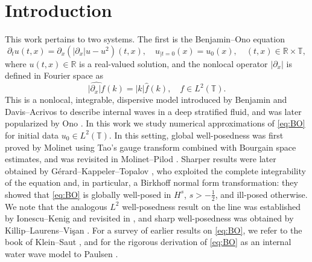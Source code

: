 \documentclass [11pt] {article}
\newcommand{\<}{\langle}
\renewcommand{\>}{\rangle}
\begin{document}

\section{Introduction}

 This work pertains to two systems.  The first
is the Benjamin--Ono equation
%
\begin{equation}\label{eq:BO}\tag{BO}
\partial_t u(t,x) = \partial_x \left( |\partial_x| u - u^2 \right)(t,x), \quad  u_{|t=0}(x) = u_0(x), \quad (t,x) \in \mathbb{R} \times \mathbb{T}, 
\end{equation}
\renewcommand*{\theHequation}{notag.\theequation}%
%
where $u(t,x)\in \mathbb{R}$ is a real-valued solution, and the nonlocal operator $|\partial_x|$ is defined in Fourier space as
\[
\widehat{|\partial_x|f}(k) = |k|\widehat{f}(k), \quad f\in L^2(\mathbb T).
\]
This is a nonlocal, integrable, dispersive model introduced by Benjamin \cite{BO} and Davis--Acrivos \cite{davis1967solitary} to describe internal waves in a deep stratified fluid, and was later popularized by Ono \cite{ono1975algebraic}.
%
In this work we study numerical approximations of \eqref{eq:BO} for initial data $u_0 \in L^2(\mathbb{T})$. In this setting, {global well-posedness was first proved by Molinet \cite{Molinet08}} using Tao’s gauge transform combined with Bourgain space estimates, and was revisited in Molinet--Pilod \cite{Molinet12}. Sharper results were later obtained by Gérard–Kappeler–Topalov \cite{Gerard23WP}, who exploited the complete integrability of the equation and, in particular, a Birkhoff normal form transformation: they showed that \eqref{eq:BO} is globally well-posed in $H^s$, $s>-\frac12$, and ill-posed otherwise. We note that the analogous $L^2$ well-posedness result on the line was established by Ionescu--Kenig \cite{IK} and revisited in \cites{Molinet12,IT,Talbut}, and sharp well-posedness was obtained by Killip--Laurens--Vi\c{s}an \cite{Killip24}.
For a survey of earlier results on \eqref{eq:BO}, we refer to the book of Klein--Saut \cite[Chapter 3]{KS-book-BO}, and for the rigorous derivation of \eqref{eq:BO} as an internal water wave model to Paulsen \cite{P24-BO}.
\newline
\end{document}
